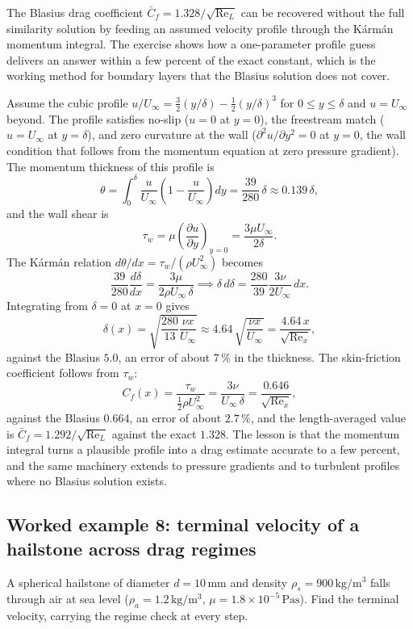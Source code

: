 The Blasius drag coefficient $\bar C_f = 1.328/\sqrt{\text{Re}_L}$
can be recovered without the full similarity solution by feeding an
assumed velocity profile through the Kármán momentum integral. The
exercise shows how a one-parameter profile guess delivers an answer
within a few percent of the exact constant, which is the working
method for boundary layers that the Blasius solution does not cover.

Assume the cubic profile $u/U_\infty = \tfrac32(y/\delta) -
\tfrac12(y/\delta)^3$ for $0\le y\le\delta$ and $u = U_\infty$
beyond. The profile satisfies no-slip ($u=0$ at $y=0$), the
freestream match ($u=U_\infty$ at $y=\delta$), and zero curvature at
the wall ($\partial^2 u/\partial y^2 = 0$ at $y=0$, the wall
condition that follows from the momentum equation at zero pressure
gradient). The momentum thickness of this profile is
\[
\theta = \int_0^\delta \frac{u}{U_\infty}\!\left(1 -
\frac{u}{U_\infty}\right)dy = \frac{39}{280}\,\delta \approx
0.139\,\delta,
\]
and the wall shear is
\[
\tau_w = \mu\left(\frac{\partial u}{\partial y}\right)_{y=0} =
\frac{3\mu U_\infty}{2\delta}.
\]
The Kármán relation $d\theta/dx = \tau_w/(\rho U_\infty^2)$ becomes
\[
\frac{39}{280}\frac{d\delta}{dx} = \frac{3\mu}{2\rho U_\infty\,
\delta} \implies \delta\,d\delta = \frac{280}{39}\frac{3\nu}{2
U_\infty}\,dx.
\]
Integrating from $\delta=0$ at $x=0$ gives
\[
\delta(x) = \sqrt{\frac{280}{13}\frac{\nu x}{U_\infty}} \approx
4.64\,\sqrt{\frac{\nu x}{U_\infty}} = \frac{4.64\,x}{\sqrt{\text{Re}_x}},
\]
against the Blasius $5.0$, an error of about $7\,\%$ in the thickness.
The skin-friction coefficient follows from $\tau_w$:
\[
C_f(x) = \frac{\tau_w}{\tfrac12\rho U_\infty^2} = \frac{3\nu}{
U_\infty\,\delta} = \frac{0.646}{\sqrt{\text{Re}_x}},
\]
against the Blasius $0.664$, an error of about $2.7\,\%$, and the
length-averaged value is $\bar C_f = 1.292/\sqrt{\text{Re}_L}$
against the exact $1.328$. The lesson is that the momentum integral
turns a plausible profile into a drag estimate accurate to a few
percent, and the same machinery extends to pressure gradients and to
turbulent profiles where no Blasius solution exists.

\subsection*{Worked example 8: terminal velocity of a hailstone across drag regimes}

A spherical hailstone of diameter $d = 10\,\si{\milli\meter}$ and
density $\rho_s = 900\,\si{\kilogram\per\meter\cubed}$ falls through
air at sea level ($\rho_a = 1.2\,\si{\kilogram\per\meter\cubed}$,
$\mu = 1.8\times10^{-5}\,\si{\pascal\second}$). Find the terminal
velocity, carrying the regime check at every step.


